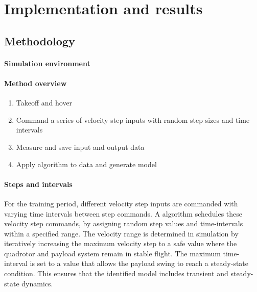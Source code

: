 \section{Implementation and results}
    \subsection{Methodology}
        \paragraph{Simulation environment}

        \paragraph{Method overview}

        \begin{enumerate}
            \item Takeoff and hover
            \item Command a series of velocity step inputs with random step sizes and time intervals
            \item Measure and save input and output data
            \item Apply algorithm to data and generate model
        \end{enumerate}

        \paragraph{}

        \paragraph{Steps and intervals}
        For the training period, different velocity step inputs are commanded with varying time intervals between step commands.
        A algorithm schedules these velocity step commands, by assigning random step values and time-intervals within a specified range.
        The velocity range is determined in simulation by iteratively increasing the maximum velocity step 
        to a safe value where the quadrotor and payload system remain in stable flight.
        The maximum time-interval is set to a value that allows the payload swing to reach a steady-state condition.
        This ensures that the identified model includes transient and steady-state dynamics.

